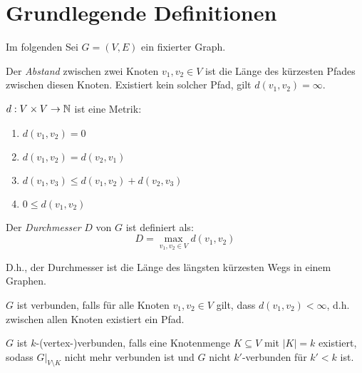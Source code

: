 \chapter{Grundlegende Definitionen}

Im folgenden Sei $ G = (V, E) $ ein fixierter Graph.

\begin{definition}[Abstand]
    Der \textit{Abstand} zwischen zwei Knoten $ v_1, v_2 \in V $ ist die Länge des kürzesten Pfades zwischen diesen Knoten.
    Existiert kein solcher Pfad, gilt $ d(v_1, v_2) = \infty $.
\end{definition}

\begin{observation}
    $ d : V \times V \rightarrow \mathbb{N} $ ist eine Metrik:
    \begin{enumerate}
        \item $ d(v_1, v_2) = 0 $
        \item $ d(v_1, v_2) = d(v_2, v_1) $
        \item $ d(v_1, v_3) \leq d(v_1, v_2) + d(v_2, v_3) $
        \item $ 0 \leq d(v_1, v_2) $
    \end{enumerate}
\end{observation}

\begin{definition}[Durchmesser]
    Der \textit{Durchmesser} $ D $ von $ G $ ist definiert als:
    \begin{equation*}
        D = \max_{v_1, v_2 \in V} d(v_1, v_2)
    \end{equation*}

    D.h., der Durchmesser ist die Länge des längsten kürzesten Wegs in einem Graphen.
\end{definition}

\begin{definition}[Verbundenheit]
    $ G $ ist verbunden, falls für alle Knoten $ v_1, v_2 \in V $ gilt, dass $ d(v_1, v_2) < \infty $, d.h. zwischen allen Knoten existiert ein Pfad.
\end{definition}

\begin{definition}
    $ G $ ist $ k $-(vertex-)verbunden, falls eine Knotenmenge $ K \subseteq V $ mit $ |K| = k $ existiert, sodass $ G|_{V \setminus K} $ nicht mehr verbunden ist und $ G $ nicht $ k' $-verbunden für $ k' < k $ ist.
\end{definition}
